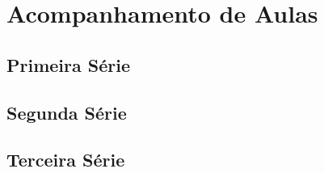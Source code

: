 \chapter{Acompanhamento de Aulas}
\label{cap: acmpDeAulas}
\section{Primeira Série}
\section{Segunda Série}
\section{Terceira Série}